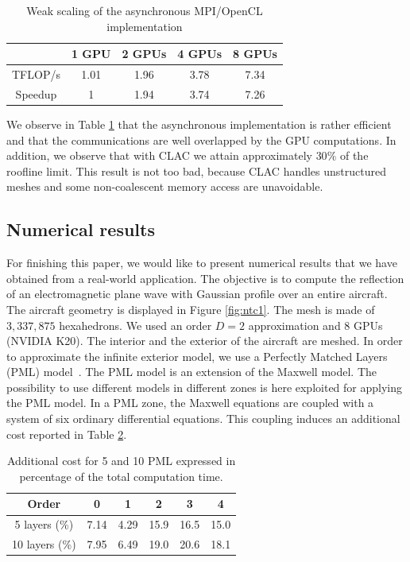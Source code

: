 \documentclass[preprint]{sig-alternate}
\begin{document}
\begin{table}[htdp]
\begin{center}
\begin{tabular}{|c|c|c|c|c|}
\hline
 & 1 GPU & 2 GPUs & 4 GPUs & 8 GPUs\tabularnewline
\hline
\hline
TFLOP/s & 1.01 & 1.96 & 3.78 & 7.34\tabularnewline
\hline
Speedup & 1 & 1.94 & 3.74 & 7.26\tabularnewline
\hline
\end{tabular}
\end{center}
\caption{Weak scaling of the asynchronous MPI/OpenCL implementation \label{tab:async-perfs}}
\end{table}%


We observe in Table \ref{tab:async-perfs} that the asynchronous implementation is rather efficient and that the communications are well overlapped by the GPU computations. In addition, we observe that with CLAC we attain approximately $30\%$ of the roofline limit. This result is not too bad, because CLAC handles unstructured meshes and some non-coalescent memory access are unavoidable.


\subsection{Numerical results}


For finishing this paper, we would like to present numerical results that we have obtained from a real-world application. The objective is to compute the reflection of an electromagnetic plane wave with Gaussian profile over an entire aircraft.  The aircraft geometry is displayed in Figure \ref{fig:ntc1}. The mesh is made of $3,337,875$ hexahedrons. We used an order $D=2$ approximation and 8 GPUs (NVIDIA K20). The interior and the exterior of the aircraft are meshed. In order to approximate the infinite exterior model, we use a Perfectly Matched Layers (PML) model~\cite{berenger}. The PML model is an extension of the Maxwell model. The possibility to use different models in different zones is here exploited for applying the PML model. In a PML
zone, the Maxwell equations are coupled with a system of six ordinary
differential equations. This coupling induces an additional cost reported
in Table \ref{tab:cost_pml}.


\begin{table}[h]
  \centering
  \begin{tabular}[h]{|c||c|c|c|c|c|}
    \hline
             Order &    0 &    1 &    2 &    3 &    4 \\ \hline
     5 layers (\%) & 7.14 & 4.29 & 15.9 & 16.5 & 15.0 \\ \hline
    10 layers (\%) & 7.95 & 6.49 & 19.0 & 20.6 & 18.1 \\ \hline
  \end{tabular}
  \caption{Additional cost for 5 and 10 PML expressed in percentage of the
    total computation time.}
  \label{tab:cost_pml}
\end{table}
\end{document}
